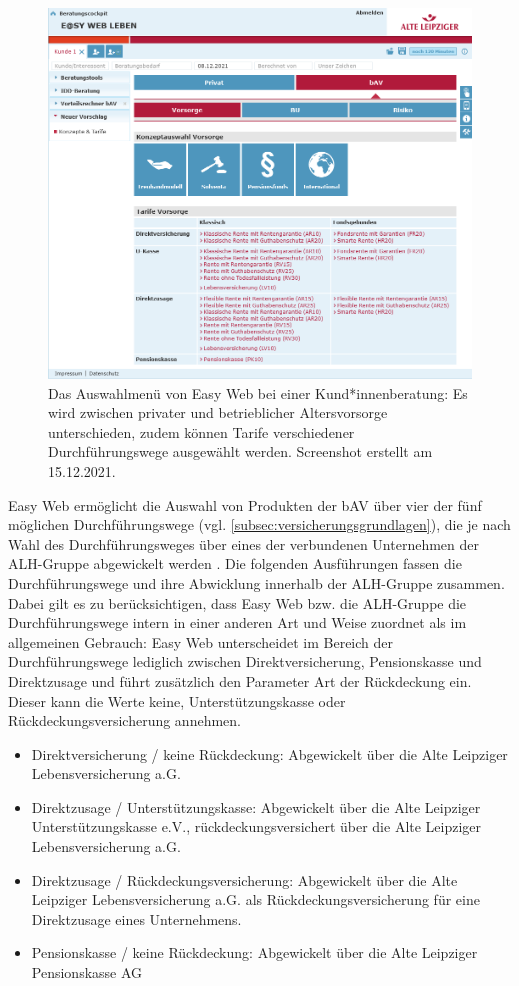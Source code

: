 \begin{figure}[!htb]
\centering
\includegraphics[width=0.7\columnwidth]{images/Easy_Web_Leben_Auswahl.png}
\caption{Das Auswahlmenü von Easy Web bei einer Kund*innenberatung: Es wird zwischen privater und betrieblicher Altersvorsorge unterschieden, zudem können Tarife verschiedener Durchführungswege ausgewählt werden. Screenshot erstellt am 15.12.2021.}
\label{fig:easyWebAuswahl}
\end{figure}

Easy Web ermöglicht die Auswahl von Produkten der bAV über vier der fünf möglichen Durchführungswege (vgl. \autoref{subsec:versicherungsgrundlagen}), die je nach Wahl des Durchführungsweges über eines der verbundenen Unternehmen der ALH-Gruppe abgewickelt werden \cite{alh_bav}. Die folgenden Ausführungen fassen die Durchführungswege und ihre Abwicklung innerhalb der ALH-Gruppe zusammen. Dabei gilt es zu berücksichtigen, dass Easy Web bzw. die ALH-Gruppe die Durchführungswege intern in einer anderen Art und Weise zuordnet als im allgemeinen Gebrauch: Easy Web unterscheidet im Bereich der Durchführungswege lediglich zwischen Direktversicherung, Pensionskasse und Direktzusage und führt zusätzlich den Parameter \glqq Art der Rückdeckung\grqq{} ein. Dieser kann die Werte \glqq keine\grqq{}, \glqq Unterstützungskasse\grqq{} oder \glqq Rückdeckungsversicherung\grqq{} annehmen.
\begin{itemize}
\item Direktversicherung / keine Rückdeckung: Abgewickelt über die Alte Leipziger Lebensversicherung a.G.
\item Direktzusage / Unterstützungskasse: Abgewickelt über die Alte Leipziger Unterstützungskasse e.V., rückdeckungsversichert über die Alte Leipziger Lebensversicherung a.G.
\item Direktzusage / Rückdeckungsversicherung: Abgewickelt über die Alte Leipziger Lebensversicherung a.G. als Rückdeckungsversicherung für eine Direktzusage eines Unternehmens.
\item Pensionskasse / keine Rückdeckung: Abgewickelt über die Alte Leipziger Pensionskasse AG
\end{itemize} 

